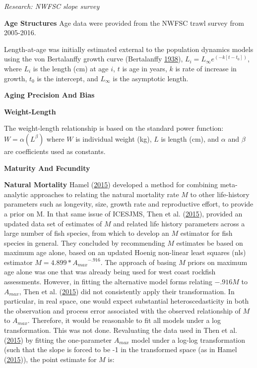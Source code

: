 \documentclass[12pt,]{article}
\begin{document}
\emph{Research: NWFSC slope survey}

\vspace{.5cm}

\textbf{Age Structures} Age data were provided from the NWFSC trawl
survey from 2005-2016.

Length-at-age was initially estimated external to the population
dynamics models using the von Bertalanffy growth curve (Bertalanffy
\protect\hyperlink{ref-vonB1938}{1938}),
\(L_i = L_{\infty}e^{(-k[t-t_0])}\), where \(L_i\) is the length (cm) at
age \(i\), \(t\) is age in years, \(k\) is rate of increase in growth,
\(t_0\) is the intercept, and \(L_{\infty}\) is the asymptotic length.

\vspace{.5cm}

\textbf{Aging Precision And Bias}

\vspace{.5cm}

\textbf{Weight-Length}

The weight-length relationship is based on the standard power function:
\(W = \alpha(L^\beta)\) where \(W\) is individual weight (kg), \(L\) is
length (cm), and \(\alpha\) and \(\beta\) are coefficients used as
constants.

\vspace{.5cm}

\textbf{Maturity And Fecundity}

\vspace{.5cm}

\textbf{Natural Mortality} Hamel
(\protect\hyperlink{ref-Hamel2015}{2015}) developed a method for
combining meta-analytic approaches to relating the natural mortality
rate \(M\) to other life-history parameters such as longevity, size,
growth rate and reproductive effort, to provide a prior on M. In that
same issue of ICESJMS, Then et al.
(\protect\hyperlink{ref-Then2015}{2015}), provided an updated data set
of estimates of \(M\) and related life history parameters across a large
number of fish species, from which to develop an \(M\) estimator for
fish species in general. They concluded by recommending \(M\) estimates
be based on maximum age alone, based on an updated Hoenig non-linear
least squares (nls) estimator \(M= 4.899*{A_{max}}^{-.916}\). The
approach of basing \(M\) priors on maximum age alone was one that was
already being used for west coast rockfish assessments. However, in
fitting the alternative model forms relating \(-.916M\) to \(A_{max}\),
Then et al. (\protect\hyperlink{ref-Then2015}{2015}) did not
consistently apply their transformation. In particular, in real space,
one would expect substantial heteroscedasticity in both the observation
and process error associated with the observed relationship of \(M\) to
\(A_{max}\). Therefore, it would be reasonable to fit all models under a
log transformation. This was not done. Revaluating the data used in Then
et al. (\protect\hyperlink{ref-Then2015}{2015}) by fitting the
one-parameter \(A_{max}\) model under a log-log transformation (such
that the slope is forced to be -1 in the transformed space (as in Hamel
(\protect\hyperlink{ref-Hamel2015}{2015})), the point estimate for \(M\)
is:
\end{document}
